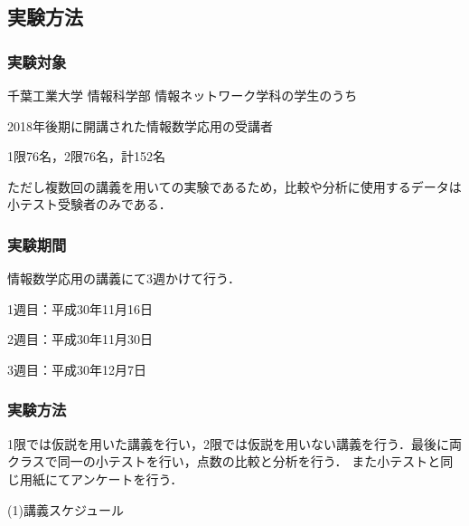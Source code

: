 \documentclass[a4j,12pt]{jsarticle}
\begin{document}
\subsection{実験方法}
\subsubsection{実験対象}

千葉工業大学 情報科学部 情報ネットワーク学科の学生のうち

2018年後期に開講された情報数学応用の受講者

1限76名，2限76名，計152名

ただし複数回の講義を用いての実験であるため，比較や分析に使用するデータは小テスト受験者のみである．


\subsubsection{実験期間}

情報数学応用の講義にて3週かけて行う．

1週目：平成30年11月16日

2週目：平成30年11月30日

3週目：平成30年12月7日



\subsubsection{実験方法}

1限では仮説を用いた講義を行い，2限では仮説を用いない講義を行う．最後に両クラスで同一の小テストを行い，点数の比較と分析を行う．
また小テストと同じ用紙にてアンケートを行う．

(1)講義スケジュール
\end{document}
